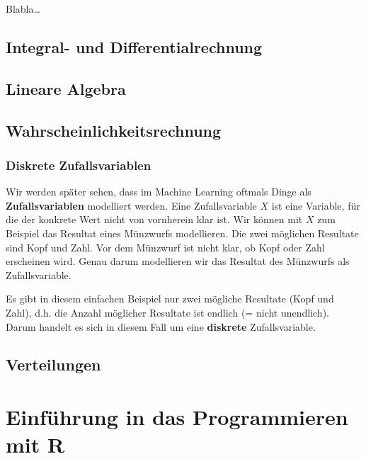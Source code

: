 \documentclass[
]{book}
\begin{document}
Blabla\ldots{}

\hypertarget{integral--und-differentialrechnung}{%
\section{Integral- und Differentialrechnung}\label{integral--und-differentialrechnung}}

\hypertarget{lineare-algebra}{%
\section{Lineare Algebra}\label{lineare-algebra}}

\hypertarget{wahrscheinlichkeitsrechnung}{%
\section{Wahrscheinlichkeitsrechnung}\label{wahrscheinlichkeitsrechnung}}

\hypertarget{diskrete-zufallsvariablen}{%
\subsection{Diskrete Zufallsvariablen}\label{diskrete-zufallsvariablen}}

Wir werden später sehen, dass im Machine Learning oftmals Dinge als \textbf{Zufallsvariablen} modelliert werden. Eine Zufallsvariable \(X\) ist eine Variable, für die der konkrete Wert nicht von vornherein klar ist. Wir können mit \(X\) zum Beispiel das Resultat eines Münzwurfs modellieren. Die zwei möglichen Resultate sind Kopf und Zahl. Vor dem Münzwurf ist nicht klar, ob Kopf oder Zahl erscheinen wird. Genau darum modellieren wir das Resultat des Münzwurfs als Zufallsvariable.

Es gibt in diesem einfachen Beispiel nur zwei mögliche Resultate (Kopf und Zahl), d.h. die Anzahl möglicher Resultate ist endlich (= nicht unendlich). Darum handelt es sich in diesem Fall um eine \textbf{diskrete} Zufallsvariable.

\hypertarget{verteilungen}{%
\section{Verteilungen}\label{verteilungen}}

\hypertarget{intro-R}{%
\chapter{Einführung in das Programmieren mit R}\label{intro-R}}
\end{document}
